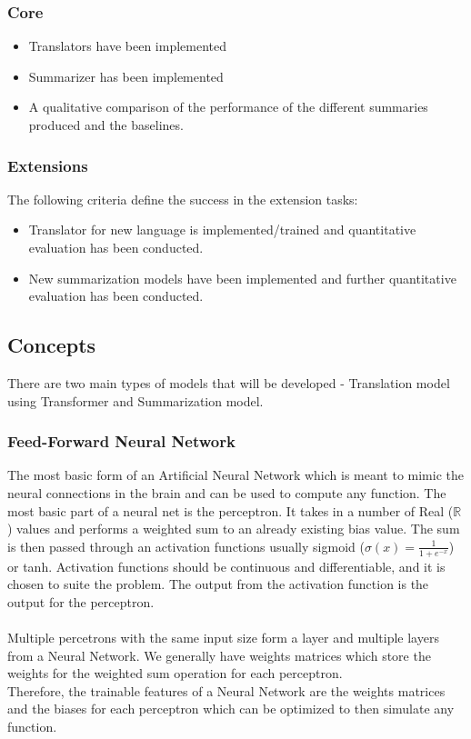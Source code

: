 \documentclass[12pt, a4paper]{article}
\begin{document}
\subsubsection*{Core}
\begin{itemize}
  \item Translators have been implemented
  \item Summarizer has been implemented
  \item A qualitative comparison of the performance of the different summaries produced and the baselines.
\end{itemize}

\subsubsection*{Extensions}
The following criteria define the success in the extension tasks:
\begin{itemize}
  \item Translator for new language is implemented/trained and quantitative evaluation has been conducted.
  \item New summarization models have been implemented and further quantitative evaluation has been conducted.
\end{itemize}


\subsection*{Concepts}
There are two main types of models that will be developed - Translation model using Transformer and Summarization model. 

\subsubsection*{Feed-Forward Neural Network}
The most basic form of an Artificial Neural Network which is meant to mimic the neural connections in the brain and can be used to compute any function. The most basic part of a neural net is the perceptron. It takes in a number of Real ($\mathds{R}$) values and performs a weighted sum to an already existing bias value. The sum is then passed through an activation functions usually sigmoid (\( \sigma(x) = \frac{1}{1 + e^{-x}} \)) or tanh. Activation functions should be continuous and differentiable, and it is chosen to suite the problem. The output from the activation function is the output for the perceptron. \\
\\
Multiple percetrons with the same input size form a layer and multiple layers from a Neural Network. We generally have weights matrices which store the weights for the weighted sum operation for each perceptron. \\  
Therefore, the trainable features of a Neural Network are the weights matrices and the biases for each perceptron which can be optimized to then simulate any function. 
\end{document}
